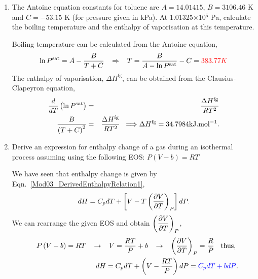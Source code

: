 \begin{enumerate}[1)]
\clearpage
\item\label{Mod03Ex03} The Antoine equation constants for toluene are $A=14.01415$, $B=3106.46$ K and $C=-53.15$ K (for pressure given in kPa). At 1.01325$\times$10$^{5}$ Pa, calculate the boiling temperature and the enthalpy of vaporisation at this temperature.

     Boiling temperature can be calculated from the Antoine equation,
       \begin{displaymath}
          \ln{P^{\text{sat}}} = A - \frc{B}{T+C} \;\;\;\Rightarrow \;\;\; T = \frc{B}{A-\ln{P^{\text{sat}}}} - C = \red{383.77 K}
       \end{displaymath}
The enthalpy of vaporisation, $\Delta H^{\text{fg}}$, can be obtained from the Clausius-Clapeyron equation,
         \begin{eqnarray}
            \frc{d}{dT} \left(\ln{P^{\text{sat}}}\right) &=& \frc{\Delta H^{\text{fg}}}{RT^{2}} \nonumber \\
             \frc{B}{\left(T+C\right)^{2}} &=&  \frc{\Delta H^{\text{fg}}}{RT^{2}} \;\;\Longrightarrow \Delta H^{\text{fg}} = 34.7984 \text{kJ.mol}^{-1}. \nonumber
         \end{eqnarray}
 
\clearpage

\item\label{Mod03Ex04} Derive an expression for enthalpy change of a gas during an isothermal process assuming using the following EOS: $P\left(V-b\right)=RT$

     We have seen that enthalpy change is given by Eqn.~\ref{Mod03_DerivedEnthalpyRelation1},
    \begin{displaymath}
       dH = C_{p}dT + \left[V - T\Partial[V]{T}{P}\right]dP.
    \end{displaymath}
    We can rearrange the given EOS and obtain $\Partial[V]{T}{P}$,
    \begin{eqnarray}
       && P\left(V-b\right)=RT \;\;\;\rightarrow\;\;\; V = \frc{RT}{P} + b \;\;\;\rightarrow\;\;\; \Partial[V]{T}{P} = \frc{R}{P}\;\;\text{ thus, } \nonumber \\
       && dH = C_{p}dT + \left(V - \frc{RT}{P}\right)dP = \blue{C_{p}dT + bdP}. \nonumber 
    \end{eqnarray}
    
\clearpage
    
\clearpage
 

\end{enumerate}
